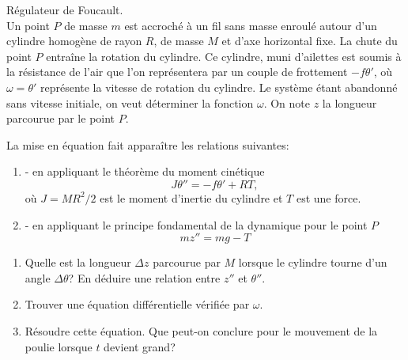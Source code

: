 
\begin{exercice}\label{exoEqsDiff0011}


Régulateur de Foucault.\\
Un point $P$ de masse $m$ est accroché à un fil sans masse enroulé autour d'un cylindre homogène de rayon $R$, de masse $M$ et d'axe horizontal fixe. La chute du point $P$  entraîne la rotation du cylindre. Ce cylindre, muni d'ailettes est soumis à la résistance de l'air que l'on représentera par un couple de frottement $-f\theta'$, où $\omega = \theta'$ représente la vitesse de rotation du cylindre. Le système étant abandonné sans vitesse initiale, on veut déterminer la fonction $\omega$. On note $z$ la longueur parcourue par le point $P$.

La mise en équation fait apparaître les relations suivantes:
\begin{enumerate}
\item - en appliquant le théorème du moment cinétique
\[
	J\theta''=-f\theta'+RT,
\]
où $J=MR^2/2$ est le moment d'inertie du cylindre et $T$ est une force.
\item - en appliquant le principe fondamental de la dynamique pour le point $P$
\[
mz''=mg-T
\]
\end{enumerate}
\begin{enumerate}
\item Quelle est la longueur $\Delta z$ parcourue par $M$ lorsque le cylindre tourne  d'un angle $\Delta \theta$? En déduire une relation entre $z''$ et $\theta''$.
\item Trouver une équation différentielle vérifiée par $\omega$.
\item Résoudre cette équation. Que peut-on conclure pour le mouvement de la poulie lorsque $t$ devient grand?
\end{enumerate}

\end{exercice}
